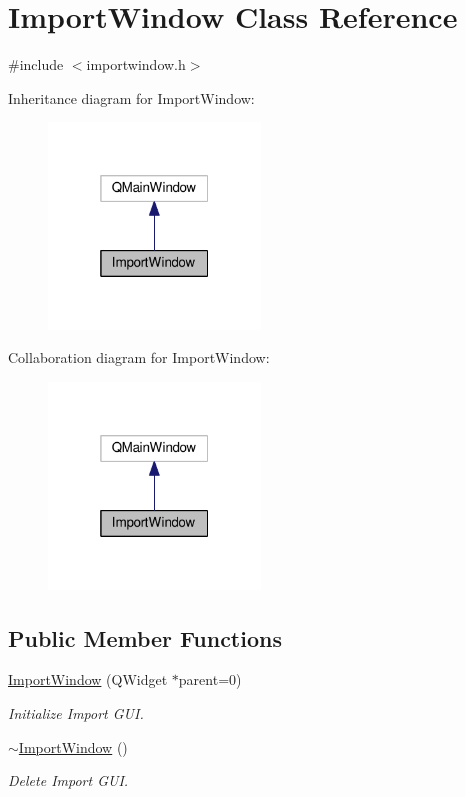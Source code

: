 \hypertarget{class_import_window}{}\section{Import\+Window Class Reference}
\label{class_import_window}


{\ttfamily \#include $<$importwindow.\+h$>$}



Inheritance diagram for Import\+Window\+:
\nopagebreak
\begin{figure}[H]
\begin{center}
\leavevmode
\includegraphics[width=160pt]{class_import_window__inherit__graph}
\end{center}
\end{figure}


Collaboration diagram for Import\+Window\+:
\nopagebreak
\begin{figure}[H]
\begin{center}
\leavevmode
\includegraphics[width=160pt]{class_import_window__coll__graph}
\end{center}
\end{figure}
\subsection*{Public Member Functions}
\begin{DoxyCompactItemize}
\item 
\hyperlink{class_import_window_afe9636b4ecf8c7c7b01439cbd77242be}{Import\+Window} (Q\+Widget $\ast$parent=0)
\begin{DoxyCompactList}\small\item\em Initialize Import G\+UI. \end{DoxyCompactList}\item 
\hyperlink{class_import_window_ae5d71ebcfac6a7f4abfbc2070a35de37}{$\sim$\+Import\+Window} ()
\begin{DoxyCompactList}\small\item\em Delete Import G\+UI. \end{DoxyCompactList}\end{DoxyCompactItemize}

